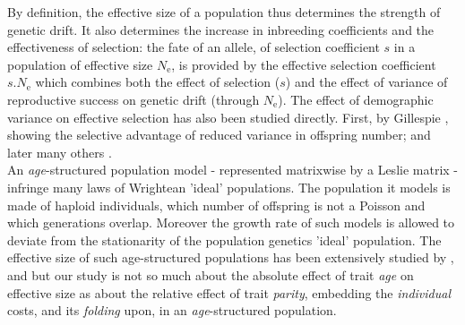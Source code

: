 \documentclass[10pt,a4paper]{article}
\newcommand{\PCoR}{\emph{individual} costs}
\begin{document}
By definition, the effective size of a population thus determines the strength of genetic drift. It also determines the increase in inbreeding coefficients and the effectiveness of selection: 
the fate of an allele, of selection coefficient $s$ in a population of effective size $N_{\mathrm{e}}$, is provided by the effective selection coefficient $s.N_{\mathrm{e}}$ which combines both the effect of selection ($s$) and the effect of variance of reproductive success on genetic drift (through $N_{\mathrm{e}}$). The effect of demographic variance on effective selection has also been studied directly. First, by Gillespie \citep{Gillespie1974,Gillespie1975}, showing the selective advantage of reduced variance in offspring number; and later many others \citep[see, for instance,][]{Shpak2005,Shpak2007,Giaimo2014}.  \\

An \emph{age}-structured population model - represented matrixwise by a Leslie matrix - infringe many laws of Wrightean 'ideal' populations. The population it models is made of haploid individuals, which number of offspring is not a Poisson and which generations overlap. Moreover the growth rate of such models is allowed to deviate from the stationarity of the population genetics 'ideal' population. The effective size of such age-structured populations has been extensively studied by \citet{Felsenstein1971}, \citet{Hill1979,Hill1972} and \citet{Nomura1996a} but our study is not so much about the absolute effect of trait \emph{age} on effective size as about the relative effect of trait \emph{parity}, embedding the \PCoR, and its \emph{folding} upon, in an \emph{age}-structured population. %
\end{document}
